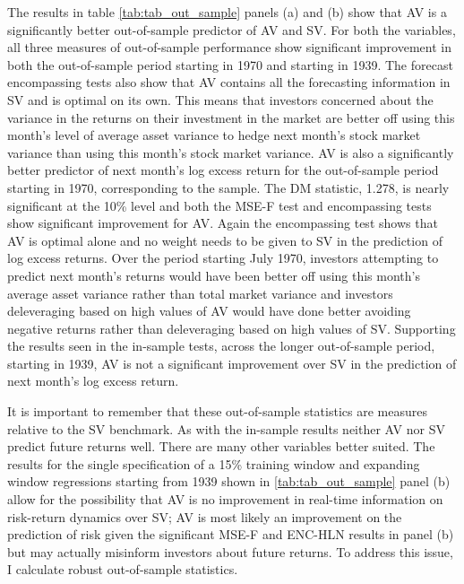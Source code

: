 The results in table \ref{tab:tab_out_sample} panels (a) and (b) show that AV is a significantly better out-of-sample predictor of AV and SV. For both the variables, all three measures of out-of-sample performance show significant improvement in both the out-of-sample period starting in 1970 and starting in 1939. The forecast encompassing tests also show that AV contains all the forecasting information in SV and is optimal on its own. This means that investors concerned about the variance in the returns on their investment in the market are better off using this month's level of average asset variance to hedge next month's stock market variance than using this month's stock market variance. AV is also a significantly better predictor of next month's log excess return for the out-of-sample period starting in 1970, corresponding to the \citet{pollet_average_2010} sample. The DM statistic, 1.278, is nearly significant at the 10\% level and both the MSE-F test and encompassing tests show significant improvement for AV. Again the encompassing test shows that AV is optimal alone and no weight needs to be given to SV in the prediction of log excess returns. Over the period starting July 1970, investors attempting to predict next month's returns would have been better off using this month's average asset variance rather than total market variance and investors deleveraging based on high values of AV would have done better avoiding negative returns rather than deleveraging based on high values of SV. Supporting the results seen in the in-sample tests, across the longer out-of-sample period, starting in 1939, AV is not a significant improvement over SV in the prediction of next month's log excess return. 

It is important to remember that these out-of-sample statistics are measures relative to the SV benchmark. As with the in-sample results neither AV nor SV predict future returns well. There are many other variables better suited. \citep{Campbell2008,Rapach2016,deuskar_margin_2017} The results for the single specification of a 15\% training window and expanding window regressions starting from 1939 shown in \ref{tab:tab_out_sample} panel (b) allow for the possibility that AV is no improvement in real-time information on risk-return dynamics over SV; AV is most likely an improvement on the prediction of risk given the significant MSE-F and ENC-HLN results in panel (b) but may actually misinform investors about future returns. To address this issue, I calculate robust out-of-sample statistics.

